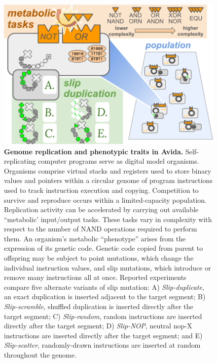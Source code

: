 \begin{figure}[!ht]
\centering
\includegraphics[width=\linewidth]{imgs/GeneDupeOps.pdf}
\caption{%
\textbf{Genome replication and phenotypic traits in Avida.}
\footnotesize
Self-replicating computer programs serve as digital model organisms.
Organisms comprise virtual stacks and registers used to store binary values and pointers within a circular genome of program instructions used to track instruction execution and copying.
Competition to survive and reproduce occurs within a limited-capacity population.
Replication activity can be accelerated by carrying out available ``metabolic' input/output tasks.
These tasks vary in complexity with respect to the number of NAND operations required to perform them.
An organism's metabolic ``phenotype'' arises from the expression of its genetic code.
Genetic code copied from parent to offspring may be subject to point mutations, which change the individual instruction values, and slip mutations, which introduce or remove many instructions all at once.
Reported experiments compare five alternate variants of slip mutation:
A) \textit{Slip-duplicate}, an exact duplication is inserted adjacent to the target segment;
B) \textit{Slip-scramble}, shuffled duplication is inserted directly after the target segment;
C) \textit{Slip-random}, random instructions are inserted directly after the target segment;
D) \textit{Slip-NOP}, neutral nop-X instructions are inserted directly after the target segment; and
E) \textit{Slip-scatter}, randomly-drawn instructions are inserted at random throughout the genome.
}
\label{fig:slip_mut_variants}
\end{figure}
